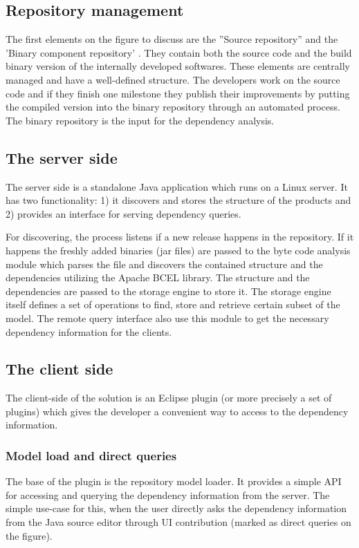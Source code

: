 \subsection{Repository management}
The first elements on the figure to discuss are the ''Source repository'' and
the 'Binary component repository' . They contain both the source code and the
build binary version of the internally developed softwares. These elements are
centrally managed and have a well-defined structure. The developers work on the
source code and if they finish one milestone they publish their improvements by
putting the compiled version into the binary repository through an automated
process.
The binary repository is the input for the dependency analysis.

\subsection{The server side}
The server side is a standalone Java application which runs on a Linux server.
It has two functionality: 1) it discovers and stores the structure of the
products and 2) provides an interface for serving dependency queries.

For discovering, the process listens if a new release happens in the repository.
If it happens the freshly added binaries (jar files) are passed to the byte code
analysis module which parses the file and discovers the contained structure and
the dependencies utilizing the Apache BCEL library.  The structure and the
dependencies are passed to the storage engine to store it. The storage engine
itself defines a set of operations to find, store and retrieve certain subset of
the model. The remote query interface also use this module to get the necessary
dependency information for the clients.


\subsection{The client side}
The client-side of the solution is an Eclipse plugin (or more precisely a set of
plugins) which gives the developer a convenient way to access to the dependency
information.

\subsubsection{Model load and direct queries}
The base of the plugin is the repository model loader. It provides a simple API
for accessing and querying the dependency information from the server. The
simple use-case for this, when the user directly asks the dependency information
from the Java source editor through UI contribution (marked as direct queries on
the figure).

